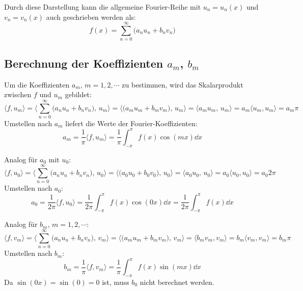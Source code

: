 			Durch diese Darstellung kann die allgemeine Fourier-Reihe mit \( u_n = u_n(x) \) und \( v_n = v_n(x) \) auch geschrieben werden als:
			\begin{equation*}
				f(x) = \sum_{n = 0}^{\infty} \big( a_n u_n + b_n v_n \big)
			\end{equation*}

		\subsection{Berechnung der Koeffizienten \(a_m\), \(b_m\)}
			Um die Koeffizienten \( a_m \), \( m = 1, 2, \cdots \) zu bestimmen, wird das Skalarprodukt zwischen \(f\) und \( u_m \) gebildet:
			\begin{equation*}
				\langle f, u_m \rangle
					= \Bigg\langle \sum_{n = 0}^{\infty} \big( a_n u_n + b_n v_n \big),\, u_m \Bigg\rangle
					= \Big\langle \big( a_m u_m + b_m v_m \big),\, u_m \Big\rangle
					= \langle a_m u_m,\, u_m \rangle
					= a_m \langle u_m, u_m \rangle
					= a_m \pi
			\end{equation*}
			Umstellen nach \( a_m \) liefert die Werte der Fourier-Koeffizienten:
			\begin{equation*}
				a_m = \frac{1}{\pi} \langle f, u_m \rangle = \frac{1}{\pi} \int_{-\pi}^{\pi} \! f(x) \cos(mx) \dd{x}
			\end{equation*}
			
			Analog für \( a_0 \) mit \( u_0 \):
			\begin{equation*}
				\langle f, u_0 \rangle
					= \Bigg\langle \sum_{n = 0}^{\infty} \big( a_n u_n + b_n v_n \big),\, u_0 \Bigg\rangle
					= \Big\langle \big( a_0 u_0 + b_0 v_0 \big),\, u_0 \Big\rangle
					= \langle a_0 u_0,\, u_0 \rangle
					= a_0 \langle u_0, u_0 \rangle
					= a_0 2\pi
			\end{equation*}
			Umstellen nach \( a_0 \):
			\begin{equation*}
				a_0 = \frac{1}{2\pi} \langle f, u_0 \rangle = \frac{1}{2\pi} \int_{-\pi}^{\pi} \! f(x) \cos(0x) \dd{x} = \frac{1}{2\pi} \int_{-\pi}^{\pi} f(x) \dd{x}
			\end{equation*}
			
			Analog für \( b_m \), \( m = 1, 2, \cdots \):
			\begin{equation*}
				\langle f, v_m \rangle
					= \Bigg\langle \sum_{n = 0}^{\infty} \big( a_n u_n + b_n v_n \big),\, v_m \Bigg\rangle
					= \Big\langle \big( a_m u_m + b_m v_m \big),\, v_m \Big\rangle
					= \langle b_m v_m, v_m \rangle
					= b_m \langle v_m, v_m \rangle
					= b_m \pi
			\end{equation*}
			Umstellen nach \( b_m \):
			\begin{equation*}
				b_m = \frac{1}{\pi} \langle f, v_m \rangle = \frac{1}{\pi} \int_{-\pi}^{\pi} \! f(x) \sin(mx) \dd{x}
			\end{equation*}
			Da \( \sin(0x) = \sin(0) = 0 \) ist, muss \( b_0 \) nicht berechnet werden.

